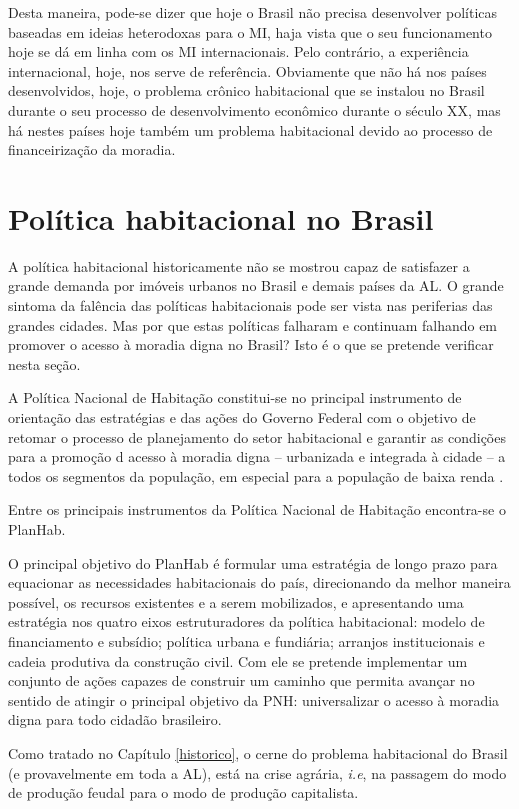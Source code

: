 \documentclass[
	12pt,				%
	oneside,			%
	a4paper,			%
	chapter=TITLE,		%
	section=TITLE,		%
	english,			%
	brazil				%
	]{abntex2}
\begin{document}
\begin{refsection}
Desta maneira, pode-se dizer que hoje o Brasil não precisa desenvolver políticas
baseadas em ideias heterodoxas para o \gls{MI}, haja vista que o seu
funcionamento hoje se dá em linha com os \gls{MI} internacionais. Pelo contrário,
a experiência internacional, hoje, nos serve de referência. Obviamente que não
há nos países desenvolvidos, hoje, o problema crônico habitacional que se
instalou no Brasil durante o seu processo de desenvolvimento econômico durante o
século XX, mas há nestes países hoje também um problema habitacional devido ao
processo de financeirização da moradia.

\hypertarget{poluxedtica-habitacional-no-brasil}{%
\section{Política habitacional no Brasil}\label{poluxedtica-habitacional-no-brasil}}

A política habitacional historicamente não se mostrou capaz de satisfazer a
grande demanda por imóveis urbanos no Brasil e demais países da \gls{AL}. O
grande sintoma da falência das políticas habitacionais pode ser vista nas
periferias das grandes cidades. Mas por que estas políticas falharam e continuam
falhando em promover o acesso à moradia digna no Brasil? Isto é o que se
pretende verificar nesta seção.

A Política Nacional de Habitação constitui-se no principal instrumento de
orientação das estratégias e das ações do Governo Federal com o objetivo de
retomar o processo de planejamento do setor habitacional e garantir as condições
para a promoção d acesso à moradia digna -- urbanizada e integrada à cidade -- a
todos os segmentos da população, em especial para a população de baixa renda
\autocite{planhab}.

Entre os principais instrumentos da Política Nacional de Habitação encontra-se o
\gls{PlanHab}.
\begin{citacao}
O principal objetivo do PlanHab é formular uma estratégia de longo prazo para
equacionar as necessidades habitacionais do país, direcionando da melhor maneira
possível, os recursos existentes e a serem mobilizados, e apresentando uma
estratégia nos quatro eixos estruturadores da política habitacional: modelo de
financiamento e subsídio; política urbana e fundiária; arranjos institucionais e
cadeia produtiva da construção civil. Com ele se pretende implementar um
conjunto de ações capazes de construir um caminho que permita avançar no sentido
de atingir o principal objetivo da PNH: universalizar o acesso à moradia digna
para todo cidadão brasileiro.
\cite[p. 9]{planhab}
\end{citacao}
Como tratado no Capítulo \ref{historico}, o cerne do problema habitacional
do Brasil (e provavelmente em toda a \gls{AL}), está na crise agrária,
\emph{i.e}, na passagem do modo de produção feudal para o modo de produção
capitalista.


\end{refsection}
\end{document}
